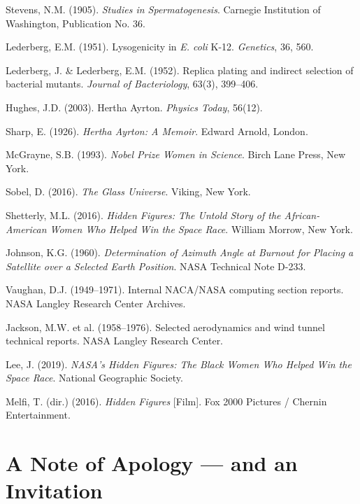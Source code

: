 \documentclass[12pt,a4paper]{article}
\begin{document}
\begin{enumerate}[leftmargin=*, label={[\arabic*]}, itemsep=6pt]
\item Stevens, N.M. (1905). \textit{Studies in Spermatogenesis}. Carnegie Institution of Washington, Publication No. 36.
\item Lederberg, E.M. (1951). Lysogenicity in \textit{E. coli} K-12. \textit{Genetics}, 36, 560.
\item Lederberg, J. \& Lederberg, E.M. (1952). Replica plating and indirect selection of bacterial mutants. \textit{Journal of Bacteriology}, 63(3), 399--406.
\item Hughes, J.D. (2003). Hertha Ayrton. \textit{Physics Today}, 56(12).
\item Sharp, E. (1926). \textit{Hertha Ayrton: A Memoir}. Edward Arnold, London.
\item McGrayne, S.B. (1993). \textit{Nobel Prize Women in Science}. Birch Lane Press, New York.
\item Sobel, D. (2016). \textit{The Glass Universe}. Viking, New York.
\item Shetterly, M.L. (2016). \textit{Hidden Figures: The Untold Story of the African-American Women Who Helped Win the Space Race}. William Morrow, New York.
\item Johnson, K.G. (1960). \textit{Determination of Azimuth Angle at Burnout for Placing a Satellite over a Selected Earth Position}. NASA Technical Note D-233.
\item Vaughan, D.J. (1949--1971). Internal NACA/NASA computing section reports. NASA Langley Research Center Archives.
\item Jackson, M.W. et al. (1958--1976). Selected aerodynamics and wind tunnel technical reports. NASA Langley Research Center.
\item Lee, J. (2019). \textit{NASA's Hidden Figures: The Black Women Who Helped Win the Space Race}. National Geographic Society.
\item Melfi, T. (dir.) (2016). \textit{Hidden Figures} [Film]. Fox 2000 Pictures / Chernin Entertainment.

\end{enumerate}

\newpage
\section*{A Note of Apology — and an Invitation}
\end{document}
